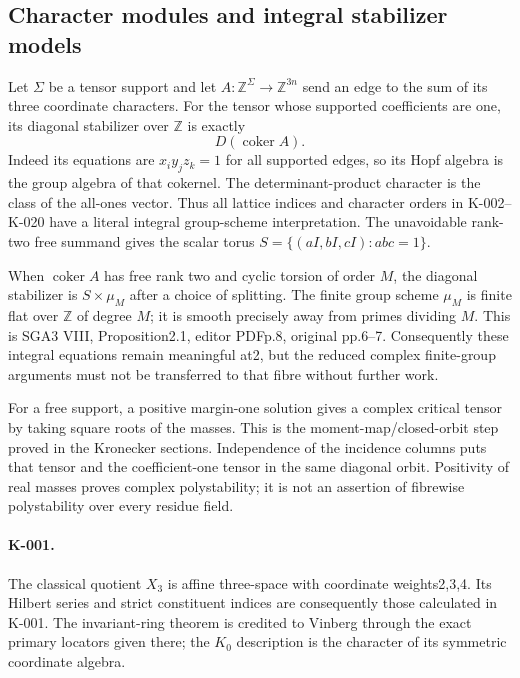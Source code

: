 \subsection{Character modules and integral stabilizer models}
Let $\Sigma$ be a tensor support and let
$A:\mathbb Z^\Sigma\longrightarrow\mathbb Z^{3n}$ send an edge
to the sum of its three coordinate characters.  For the tensor
whose supported coefficients are one, its diagonal stabilizer
over $\mathbb Z$ is exactly
\[
                 D(\operatorname{coker}A).
\]
Indeed its equations are $x_i y_j z_k=1$ for all supported
edges, so its Hopf algebra is the group algebra of that cokernel.
The determinant-product character is the class of the all-ones
vector.  Thus all lattice indices and character orders in
K-002--K-020 have a literal integral group-scheme interpretation.
The unavoidable rank-two free summand gives the scalar torus
$S=\{(aI,bI,cI):abc=1\}$.

When $\operatorname{coker}A$ has free rank two and cyclic torsion
of order $M$, the diagonal stabilizer is $S\times\mu_M$ after
a choice of splitting.  The
finite group scheme $\mu_M$ is finite flat over $\mathbb Z$ of
degree $M$; it is smooth precisely away from primes dividing
$M$.  This is SGA3 VIII, Proposition2.1, editor PDFp.8, original
pp.6--7.  Consequently these integral equations remain meaningful
at2, but the reduced complex finite-group arguments must not be
transferred to that fibre without further work.

For a free support, a positive margin-one solution gives a complex
critical tensor by taking square roots of the masses.  This is the
moment-map/closed-orbit step proved in the Kronecker sections.
Independence of the incidence columns puts that tensor and the
coefficient-one tensor in the same diagonal orbit.  Positivity of
real masses proves complex polystability; it is not an assertion
of fibrewise polystability over every residue field.

\paragraph{K-001.}
The classical quotient $X_3$ is affine three-space with coordinate
weights2,3,4.  Its Hilbert series and strict constituent indices
are consequently those calculated in K-001.  The invariant-ring
theorem is credited to Vinberg through the exact primary locators
given there; the $K_0$ description is the character of its
symmetric coordinate algebra.

